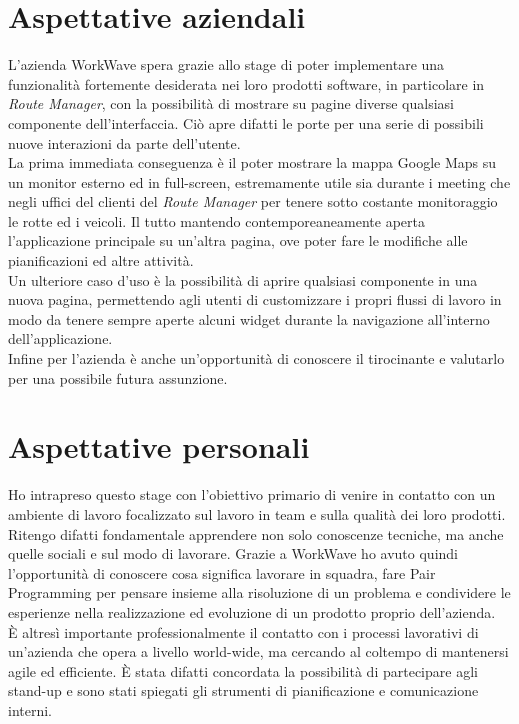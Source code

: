 \section{Aspettative aziendali}

L'azienda WorkWave spera grazie allo stage di poter implementare una funzionalità fortemente desiderata nei loro prodotti software, in particolare in \textit{Route Manager}, con la possibilità di mostrare su pagine diverse qualsiasi componente dell'interfaccia. Ciò apre difatti le porte per una serie di possibili nuove interazioni da parte dell'utente. \\

La prima immediata conseguenza è il poter mostrare la mappa Google Maps su un monitor esterno ed in full-screen, estremamente utile sia durante i meeting che negli uffici del clienti del \textit{Route Manager} per tenere sotto costante monitoraggio le rotte ed i veicoli. Il tutto mantendo contemporeaneamente aperta l'applicazione principale su un'altra pagina, ove poter fare le modifiche alle pianificazioni ed altre attività. \\

Un ulteriore caso d'uso è la possibilità di aprire qualsiasi componente in una nuova pagina, permettendo agli utenti di customizzare i propri flussi di lavoro in modo da tenere sempre aperte alcuni widget durante la navigazione all'interno dell'applicazione. \\

Infine per l'azienda è anche un'opportunità di conoscere il tirocinante e valutarlo per una possibile futura assunzione.

\section{Aspettative personali}

Ho intrapreso questo stage con l'obiettivo primario di venire in contatto con un ambiente di lavoro focalizzato sul lavoro in team e sulla qualità dei loro prodotti. Ritengo difatti fondamentale apprendere non solo conoscenze tecniche, ma anche quelle sociali e sul modo di lavorare. Grazie a WorkWave ho avuto quindi l'opportunità di conoscere cosa significa lavorare in squadra, fare \gls{Pair Programming} per pensare insieme alla risoluzione di un problema e condividere le esperienze nella realizzazione ed evoluzione di un prodotto proprio dell'azienda. \\

È altresì importante professionalmente il contatto con i processi lavorativi di un'azienda che opera a livello world-wide, ma cercando al coltempo di mantenersi agile ed efficiente. È stata difatti concordata la possibilità di partecipare agli \gls{stand-up} e sono stati spiegati gli strumenti di pianificazione e comunicazione interni. \\

